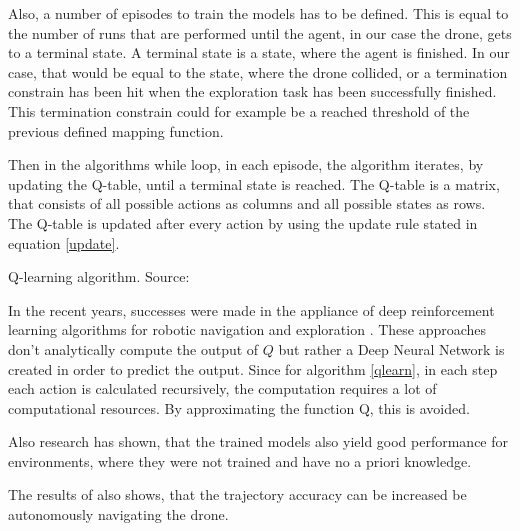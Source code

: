 \begin{enumerate}
	Also, a number of episodes to train the models has to be defined. This is equal to the number of runs that are 
    performed until the agent, in our case the drone, gets to a terminal state. A terminal state is a state, where the agent is finished. In our case, that would 
	be equal to the state, where the drone collided, or a termination constrain has been hit when the exploration task has been successfully finished.
	This termination constrain could for example be a reached 
	threshold of the previous defined mapping function. 
	
	Then in the algorithms while loop, in each episode, the algorithm iterates, by updating the Q-table, until 
	a terminal state is reached. 
	The Q-table is a matrix, that consists of all possible actions as columns and all possible states as rows. The Q-table is updated after every action by 
	using the update rule stated in equation \ref{update}. 
	
	
	\begin{algorithm}[H]
	\KwData{Parameters: $\alpha \in (0,1], \gamma \in (0,1],$ \ Initialize Q-table with arbitrary Q-values }
	\caption{Q-learning algorithm. Source: \cite{deep}}\label{qlearn}
	\end{algorithm}
	
	
	In the recent years, successes were made in the appliance of deep reinforcement learning algorithms for robotic navigation and exploration \cite{deep} \cite{accurat}. 
	These approaches don't analytically compute the output of $Q$ but rather a Deep Neural Network is created in order to predict the output. 
	Since for algorithm \ref{qlearn}, in each step each action is calculated recursively, the computation requires a lot of computational resources. By approximating the function Q, this is avoided. 
	
	Also research has shown, that the trained models also yield good performance for environments, where they were not trained and have no a priori knowledge. 

	
	The results of \cite{deep} also shows, that the trajectory accuracy can be increased be autonomously navigating the drone. 
	\begin{quote}
	

\end{quote}
\end{enumerate}
